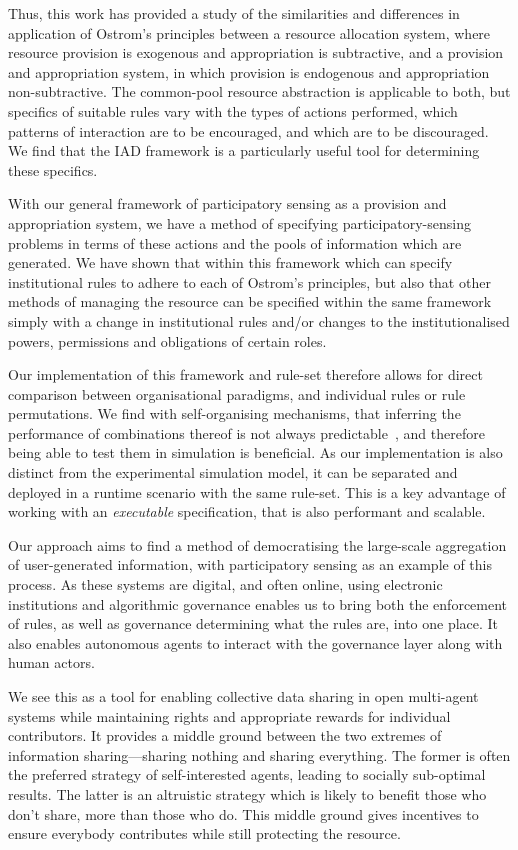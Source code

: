 Thus, this work has provided a study of the similarities and differences in
application of Ostrom's principles between a resource allocation system, where
resource provision is exogenous and appropriation is subtractive, and a
provision and appropriation system, in which provision is endogenous and
appropriation non-subtractive. The common-pool resource abstraction is
applicable to both, but specifics of suitable rules vary with the types of
actions performed, which patterns of interaction are to be encouraged, and
which are to be discouraged. We find that the \ac{IAD} framework is a
particularly useful tool for determining these specifics.

With our general framework of participatory sensing as a provision and
appropriation system, we have a method of specifying participatory-sensing
problems in terms of these actions and the pools of information which are
generated. We have shown that within this framework which can specify
institutional rules to adhere to each of Ostrom's principles, but also that
other methods of managing the resource can be specified within the same
framework simply with a change in institutional rules and/or changes to the
institutionalised powers, permissions and obligations of certain roles.

Our implementation of this framework and rule-set therefore allows for direct
comparison between organisational paradigms, and individual rules or rule
permutations. We find with self-organising mechanisms, that inferring the
performance of combinations thereof is not always
predictable~\citep{Sanderson2013}, and therefore being able to test them in
simulation is beneficial. As our implementation is also distinct from the
experimental simulation model, it can be separated and deployed in a runtime
scenario with the same rule-set. This is a key advantage of working with an
\emph{executable} specification, that is also performant and scalable.

Our approach aims to find a method of democratising the large-scale
aggregation of user-generated information, with participatory sensing as an
example of this process. As these systems are digital, and often online, using
electronic institutions and algorithmic governance enables us to bring both
the enforcement of rules, as well as governance determining what the rules
are, into one place. It also enables autonomous agents to interact with the
governance layer along with human actors.

We see this as a tool for enabling collective data sharing in open multi-agent
systems while maintaining rights and appropriate rewards for individual
contributors. It provides a middle ground between the two extremes of
information sharing---sharing nothing and sharing everything. The former is
often the preferred strategy of self-interested agents, leading to socially
sub-optimal results. The latter is an altruistic strategy which is likely to
benefit those who don't share, more than those who do. This middle ground gives
incentives to ensure everybody contributes while still protecting the resource.

